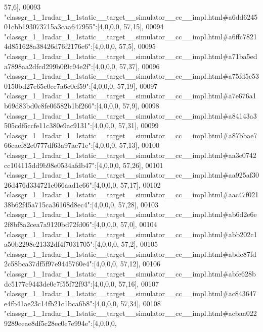 \begin{DoxyCode}
      57,6],
00093 \textcolor{stringliteral}{"classgr\_1\_1radar\_1\_1static\_\_target\_\_simulator\_\_cc\_\_impl.html#a6dd624501cbb193073715a3caa647955"}:[4,0,0,0,
      57,15],
00094 \textcolor{stringliteral}{"classgr\_1\_1radar\_1\_1static\_\_target\_\_simulator\_\_cc\_\_impl.html#a6ffc78214d851628a38426d76f2176c6"}:[4,0,0,0,
      57,5],
00095 \textcolor{stringliteral}{"classgr\_1\_1radar\_1\_1static\_\_target\_\_simulator\_\_cc\_\_impl.html#a71ba5eda7898aa2dfcd299b0f9c94e2f"}:[4,0,0,0,
      57,37],
00096 \textcolor{stringliteral}{"classgr\_1\_1radar\_1\_1static\_\_target\_\_simulator\_\_cc\_\_impl.html#a75fd5c530150bd27e65c0cc7a6c0cf59"}:[4,0,0,0,
      57,19],
00097 \textcolor{stringliteral}{"classgr\_1\_1radar\_1\_1static\_\_target\_\_simulator\_\_cc\_\_impl.html#a7e676a1b69d83bd0c8fe06582b1bf266"}:[4,0,0,0,
      57,9],
00098 \textcolor{stringliteral}{"classgr\_1\_1radar\_1\_1static\_\_target\_\_simulator\_\_cc\_\_impl.html#a84143a3505cdf5ccfe11c380e9ac9131"}:[4,0,0,0,
      57,31],
00099 \textcolor{stringliteral}{"classgr\_1\_1radar\_1\_1static\_\_target\_\_simulator\_\_cc\_\_impl.html#a87bbae766caef82e0777df63a97ac71e"}:[4,0,0,0,
      57,13],
00100 \textcolor{stringliteral}{"classgr\_1\_1radar\_1\_1static\_\_target\_\_simulator\_\_cc\_\_impl.html#aa3e0742cc104115dd9b98e0534afdb47"}:[4,0,0,0,
      57,26],
00101 \textcolor{stringliteral}{"classgr\_1\_1radar\_1\_1static\_\_target\_\_simulator\_\_cc\_\_impl.html#aa925af3026d476d334721e066aad1e66"}:[4,0,0,0,
      57,17],
00102 \textcolor{stringliteral}{"classgr\_1\_1radar\_1\_1static\_\_target\_\_simulator\_\_cc\_\_impl.html#aac47f02138b62f45a715ca36168d8ec4"}:[4,0,0,0,
      57,28],
00103 \textcolor{stringliteral}{"classgr\_1\_1radar\_1\_1static\_\_target\_\_simulator\_\_cc\_\_impl.html#ab6d2e6e2f8bf8a2cea7a9120bd72fd06"}:[4,0,0,0,
      57,0],
00104 \textcolor{stringliteral}{"classgr\_1\_1radar\_1\_1static\_\_target\_\_simulator\_\_cc\_\_impl.html#abb202c1a50b2298e21332df4f7031705"}:[4,0,0,0,
      57,2],
00105 \textcolor{stringliteral}{"classgr\_1\_1radar\_1\_1static\_\_target\_\_simulator\_\_cc\_\_impl.html#abdc87fd2c58bca37df5f97e9445760e4"}:[4,0,0,0,
      57,12],
00106 \textcolor{stringliteral}{"classgr\_1\_1radar\_1\_1static\_\_target\_\_simulator\_\_cc\_\_impl.html#abfe628bdc5177c9443de0e7f55f72f93"}:[4,0,0,0,
      57,16],
00107 \textcolor{stringliteral}{"classgr\_1\_1radar\_1\_1static\_\_target\_\_simulator\_\_cc\_\_impl.html#ac843647e4fb41ae23c14fb21c1bca6b8"}:[4,0,0,0,
      57,34],
00108 \textcolor{stringliteral}{"classgr\_1\_1radar\_1\_1static\_\_target\_\_simulator\_\_cc\_\_impl.html#acbaa0229289eeae8df5c28ec0e7e994e"}:[4,0,0,0,

\end{DoxyCode}
